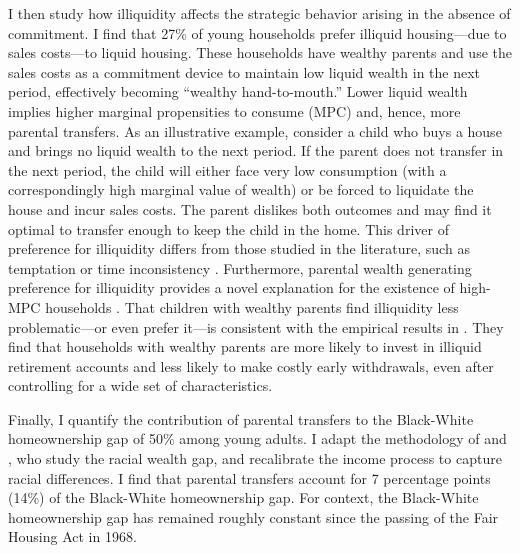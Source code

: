 \documentclass[12pt]{article}
\begin{document}
I then study how illiquidity affects the strategic behavior arising in the absence of commitment. I find that 27\% of young households prefer illiquid housing---due to sales costs---to liquid housing. These households have wealthy parents and use the sales costs as a commitment device to maintain low liquid wealth in the next period, effectively becoming ``wealthy hand-to-mouth.'' Lower liquid wealth implies higher marginal propensities to consume (MPC) and, hence, more parental transfers. As an illustrative example, consider a child who buys a house and brings no liquid wealth to the next period. If the parent does not transfer in the next period, the child will either face very low consumption (with a correspondingly high marginal value of wealth) or be forced to liquidate the house and incur sales costs. The parent dislikes both outcomes and may find it optimal to transfer enough to keep the child in the home. This driver of preference for illiquidity differs from those studied in the literature, such as temptation or time inconsistency \citep{attanasio2024temptation,laibson1997golden}. Furthermore, parental wealth generating preference for illiquidity provides a novel explanation for the existence of high-MPC households \cite[see e.g.,][]{kaplan2022marginal}. That children with wealthy parents find illiquidity less problematic---or even prefer it---is consistent with the empirical results in \cite{choukhmane2023benefits}. They find that households with wealthy parents are more likely to invest in illiquid retirement accounts and less likely to make costly early withdrawals, even after controlling for a wide set of characteristics. 

Finally, I quantify the contribution of parental transfers to the Black-White homeownership gap of 50\% among young adults. I adapt the methodology of \cite{Ashman2020} and \cite{aliprantis2022dynamics}, who study the racial wealth gap, and recalibrate the income process to capture racial differences. I find that parental transfers account for 7 percentage points (14\%) of the Black-White homeownership gap. For context, the Black-White homeownership gap has remained roughly constant since the passing of the Fair Housing Act in 1968.



\end{document}
